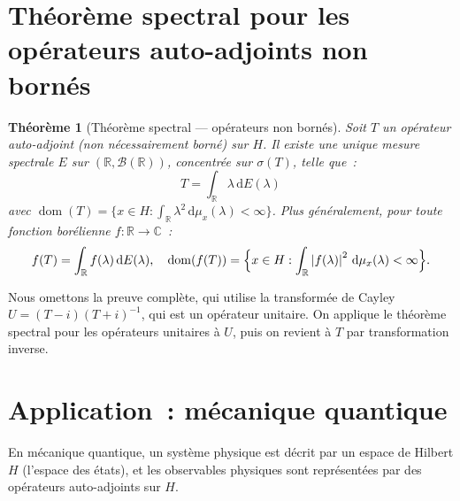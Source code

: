 \documentclass[a4paper,12pt]{book}
\DeclareMathOperator{\dom}{dom}
\newcommand{\R}{\mathbb{R}}
\newcommand{\C}{\mathbb{C}}
\newcommand{\dd}{\mathrm{d}}
\newcommand{\abs}[1]{\left| #1 \right|}
\theoremstyle{definition}
\theoremstyle{plain}
\newtheorem{theoreme}[definition]{Théorème}
\theoremstyle{remark}
\begin{document}
\section{Théorème spectral pour les opérateurs auto-adjoints non bornés}

\begin{theoreme}[Théorème spectral --- opérateurs non bornés]
\label{thm:spectral-non-borne}
Soit $T$ un opérateur auto-adjoint (non nécessairement borné) sur $H$. Il existe une
unique mesure spectrale $E$ sur $(\R, \mathcal{B}(\R))$, concentrée sur $\sigma(T)$,
telle que~:
\[
  T = \int_\R \lambda \, \dd E(\lambda)
\]
avec $\dom(T) = \{x \in H : \int_\R \lambda^2 \, \dd\mu_x(\lambda) < \infty\}$. Plus
généralement, pour toute fonction borélienne $f : \R \to \C$~:
\[
  f(T) = \int_\R f(\lambda) \, \dd E(\lambda), \quad
  \dom(f(T)) = \Bigl\{x \in H : \int_\R \abs{f(\lambda)}^2\,\dd\mu_x(\lambda) < \infty\Bigr\}.
\]
\end{theoreme}

Nous omettons la preuve complète, qui utilise la transformée de Cayley
$U = (T - i)(T + i)^{-1}$, qui est un opérateur unitaire. On applique le théorème
spectral pour les opérateurs unitaires à $U$, puis on revient à $T$ par transformation
inverse.

\section{Application~: mécanique quantique}

En mécanique quantique, un système physique est décrit par un espace de Hilbert $H$
(l'espace des états), et les observables physiques sont représentées par des opérateurs
auto-adjoints sur $H$.
\end{document}
